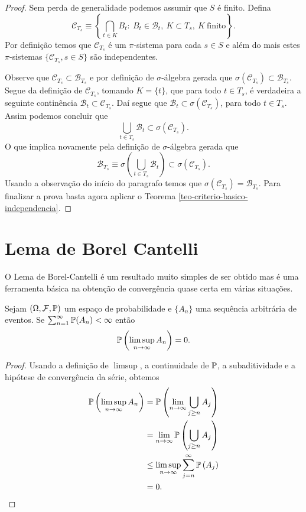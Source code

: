 \begin{proof}
Sem perda de generalidade podemos assumir que $S$ é finito. 
Defina 
	\[
		\mathcal{C}_{T_s}
		\equiv
		\left\{
			\bigcap_{t\in K} B_{t}:\
			B_{t}\in\mathscr{B}_{t},\
			K\subset T_s,\
			K\ \text{finito}
		\right\}.
	\]
Por definição temos que $\mathcal{C}_{T_s}$ é um 
$\pi$-sistema para cada $s\in S$ e além do mais 
estes $\pi$-sistemas $\{ \mathcal{C}_{T_s}, s\in S\}$ são independentes.

Observe que $\mathcal{C}_{T_s}\subset \mathscr{B}_{T_s}$ 
e por definição de $\sigma$-álgebra gerada que 
$\sigma(\mathcal{C}_{T_s})\subset \mathscr{B}_{T_s}$.
Segue da definição de $\mathcal{C}_{T_s}$, 
tomando $K=\{t\}$, que
para todo $t\in T_s$, é verdadeira a seguinte continência
$\mathscr{B}_{t}\subset \mathcal{C}_{T_s}$. 
Daí segue que $\mathscr{B}_{t}\subset \sigma(\mathcal{C}_{T_s})$,
para todo $t\in T_s$. 
Assim podemos concluir que 
	\[
		\bigcup_{t\in T_s}\mathscr{B}_{t}
		\subset
		\sigma(\mathcal{C}_{T_s}).
	\]
O que implica novamente pela definição de $\sigma$-álgebra
gerada que
	\[
		\mathscr{B}_{T_s}
		\equiv
		\sigma
		\left(
			\bigcup_{t\in T_s}\mathscr{B}_{t}
		\right)		
		\subset
		\sigma(\mathcal{C}_{T_s}).
	\]
Usando a observação do início do paragrafo temos que 
$\sigma(\mathcal{C}_{T_s}) = \mathscr{B}_{T_s}$. Para finalizar 
a prova basta agora aplicar o 
Teorema \ref{teo-criterio-basico-independencia}.
\end{proof}











\section{Lema de Borel Cantelli}

O Lema de Borel-Cantelli é um resultado muito simples 
de ser obtido mas é uma ferramenta básica na obtenção de 
convergência quase certa em várias situações.

\begin{lema}[Lema de Borel-Cantelli]
Sejam $(\Omega,\F,\P)$ um espaço de probabilidade 
e $\{A_n\}$ uma sequência arbitrária de eventos.
Se $\sum_{n=1}^{\infty} \P(A_n)<\infty$ então 
	\[
		\P\left(\limsup_{n\to\infty} A_n\right)=0.
	\]
\end{lema}




\begin{proof}
Usando a definição de $\limsup$, a continuidade de $\P$,
a subaditividade e a hipótese de convergência da série, 
obtemos
	\begin{align*}
	\P\left(\limsup_{n\to\infty} A_n\right)
	&=
	\P\left( \lim_{n\to\infty} \bigcup_{j\geq n} A_j \right)
	\\
	&=
	\lim_{n\to\infty}\P\left( \bigcup_{j\geq n} A_j \right)
	\\
	&\leq
	\limsup_{n\to\infty} \sum_{j=n}^{\infty}\P\left( A_j \right)
	\\
	&=
	0.
	\end{align*}
\end{proof}



